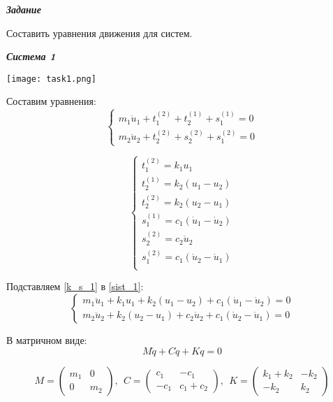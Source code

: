 \documentclass[a4paper, 12pt]{article}
\begin{document}
\begin{center}
\textbf{\textit{Задание}}
\end{center}

Составить уравнения движения для систем. 

\begin{center}
\textbf{\textit{Система 1}}
\end{center}

\texttt{[image: task1.png]}

Составим уравнения:
\begin{equation} \label{sist_1} 
\begin{cases}
m_1\ddot u_1 + t_1^{(2)} + t_2^{(1)} + s_1^{(1)} = 0 \\
m_2\ddot u_2 + t_2^{(2)} + s_2^{(2)} + s_1^{(2)} = 0
\end{cases}
\end{equation}

\begin{equation} \label{k_s_1} 
\begin{cases}
t_1^{(2)} = k_1 u_1\\
t_2^{(1)} = k_2 (u_1 - u_2)\\
t_2^{(2)} = k_2 (u_2 - u_1)\\
s_1^{(1)} = c_1 (\dot u_1 - \dot u_2)\\
s_2^{(2)} = c_2 \dot u_2\\
s_1^{(2)} = c_1 (\dot u_2 - \dot u_1)\\
\end{cases}
\end{equation}

Подставляем \eqref{k_s_1} в \eqref{sist_1}:
\[
\begin{cases}
m_1\ddot u_1 + k_1 u_1 + k_2 (u_1 - u_2) + c_1 (\dot u_1 - \dot u_2) = 0 \\
m_2\ddot u_2 + k_2 (u_2 - u_1) + c_2 \dot u_2 + c_1 (\dot u_2 - \dot u_1) = 0
\end{cases}
\]

В матричном виде:
\[
M \ddot q + C \dot q + K q = 0
\]

\[
M = \begin{pmatrix}
m_1 & 0 \\
0 & m_2
\end{pmatrix},\ \ 
C = \begin{pmatrix}
c_1 & -c_1 \\
-c_1 & c_1 + c_2
\end{pmatrix},\ \ 
K = \begin{pmatrix}
k_1 + k_2 & -k_2 \\
-k_2 & k_2
\end{pmatrix}
\]
\end{document}
